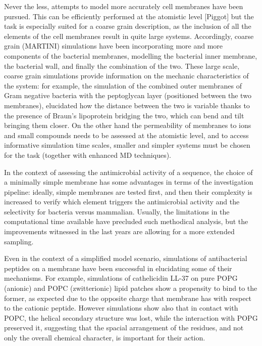Never the less, attempts to model more accurately cell membranes have been pursued. This can be efficiently performed at the atomistic level [Piggot] but the task is especially suited for a coarse grain description, as the inclusion of all the elements of the cell membranes result in quite large systems.
%
Accordingly, coarse grain (MARTINI) simulations have been incorporating more and more components of the bacterial membranes, modelling the bacterial inner membrane, the bacterial wall, and finally the combination of the two. %
%
These large scale, coarse grain simulations provide information on the mechanic characteristics of the system: for example, the simulation of the combined outer membranes of Gram negative bacteria with the peptoglycan layer (positioned between the two membranes), elucidated how the distance between the two is variable thanks to the presence of Braun's lipoprotein bridging the two, which can bend and tilt bringing them closer.
%
On the other hand the permeability of membranes to ions and small compounds needs to be assessed at the atomistic level, and to access informative simulation time scales, smaller and simpler systems must be chosen for the task (together with enhanced MD techniques).

In the context of assessing the antimicrobial activity of a sequence, the choice of a minimally simple membrane has some advantages in terms of the investigation pipeline: ideally, simple membranes are tested first, and then their complexity is increased to verify which element triggers the antimicrobial activity and the selectivity for bacteria versus mammalian. Usually, the limitations in the computational time available have precluded such methodical analysis, but the improvements witnessed in the last years are allowing for a more extended sampling.

Even in the context of a simplified model scenario, simulations of antibacterial peptides on a membrane have been successful in elucidating some of their mechanisms.
%
For example, simulations of cathelicidin LL-37 on pure POPG (anionic) and POPC (zwitterionic) lipid patches show a propensity to bind to the former, as expected due to the opposite charge that membrane has with respect to the cationic peptide. However simulations show also that in contact with POPC, the helical secondary structure was lost, while the interaction with POPG preserved it, suggesting that the spacial arrangement of the residues, and not only the overall chemical character, is important for their action.

